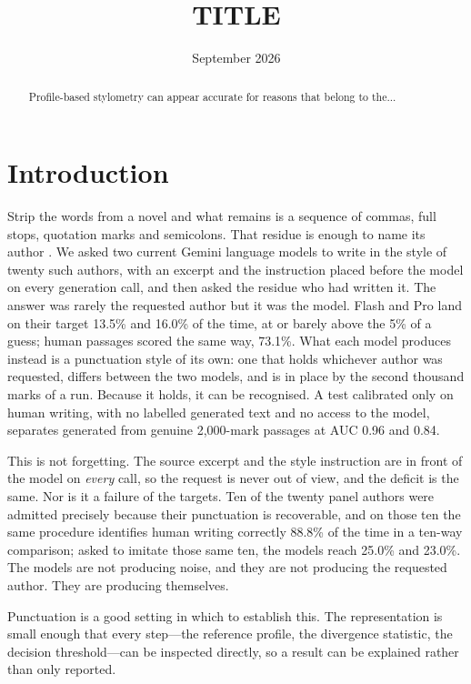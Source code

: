 \documentclass[11pt]{article}
\title{TITLE}
\date{September 2026}
\begin{document}
\maketitle

\begin{abstract}
Profile-based stylometry can appear accurate for reasons that belong to the...
\end{abstract}

\section{Introduction}
\label{sec:intro}

Strip the words from a novel and what remains is a sequence of commas,
full stops, quotation marks and semicolons.  That residue is enough to
name its author \cite{darmon2021}.  We asked two current Gemini language models
to write in the style of twenty such authors, with an excerpt and the
instruction placed before the model on every generation call, and then
asked the residue who had written it.  The answer was rarely the
requested author but it was the model.  Flash and
Pro land on their target 13.5\% and 16.0\% of the time, at or barely
above the 5\% of a guess; human passages scored the same way, 73.1\%.
What each model produces instead is a punctuation style of its own: one
that holds whichever author was requested, differs between the two
models, and is in place by the second thousand marks of a run.  Because
it holds, it can be recognised.  A test calibrated only on human
writing, with no labelled generated text and no access to the model,
separates generated from genuine 2,000-mark passages at AUC 0.96 and
0.84.

This is not forgetting.  The source excerpt and the style instruction
are in front of the model on \emph{every} call, so the request is never
out of view, and the deficit is the same.  Nor is it a failure of the
targets.  Ten of the twenty panel authors were admitted precisely
because their punctuation is recoverable, and on those ten the same
procedure identifies human writing correctly 88.8\% of the time in a
ten-way comparison; asked to imitate those same ten, the models reach
25.0\% and 23.0\%.  The models are not producing noise, and they are
not producing the requested author.  They are producing themselves.

Punctuation is a good setting in which to establish this.  The
representation is small enough that every step---the reference profile,
the divergence statistic, the decision threshold---can be inspected
directly, so a result can be explained rather than only reported.
\end{document}
